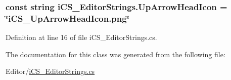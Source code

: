 \hypertarget{classi_c_s___editor_strings_a480527fa939299982127b28a9121cb04}{
\subsubsection[{Up\+Arrow\+Head\+Icon}]{\setlength{\rightskip}{0pt plus 5cm}const string i\+C\+S\+\_\+\+Editor\+Strings.\+Up\+Arrow\+Head\+Icon = \char`\"{}i\+C\+S\+\_\+\+Up\+Arrow\+Head\+Icon.\+png\char`\"{}}}\label{classi_c_s___editor_strings_a480527fa939299982127b28a9121cb04}


Definition at line 16 of file i\+C\+S\+\_\+\+Editor\+Strings.\+cs.



The documentation for this class was generated from the following file\+:\begin{DoxyCompactItemize}
\item 
Editor/\hyperlink{i_c_s___editor_strings_8cs}{i\+C\+S\+\_\+\+Editor\+Strings.\+cs}\end{DoxyCompactItemize}
